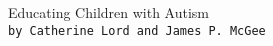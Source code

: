 

\begin{thebibliography}{9}

Educating Children with Autism
\\\texttt{by Catherine Lord and James P. McGee}

\end{thebibliography}
